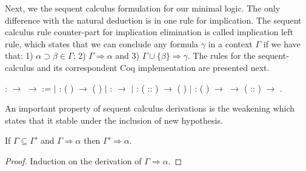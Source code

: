 Next, we the sequent calculus formulation for our minimal logic. The only
difference with the natural deduction is in one rule for implication. The
sequent calculus rule counter-part for implication elimination is called
implication left rule, which states that we can conclude any formula $\gamma$
in a context $\Gamma$ if we have that: 1) $\alpha \supset \beta \in \Gamma$;
2) $\Gamma \Rightarrow \alpha$ and 3) $\Gamma \cup \{\beta\} \Rightarrow
\gamma$. The rules for the sequent-calculus and its correspondent Coq
implementation are presented next.
 \begin{coqdoccode}
\coqdocemptyline
\coqdocnoindent
{}  : \coqdocvar{$\Gamma$} \ensuremath{\rightarrow} \coqdocvar{$\alpha$} \ensuremath{\rightarrow}  :=\coqdoceol
\coqdocnoindent
\ensuremath{|}   \coqdoceol
\coqdocindent{1.00em}
: ( ) \coqdocvar{$\in$}  \ensuremath{\rightarrow}   ( )\coqdoceol
\coqdocnoindent
\ensuremath{|}   \coqdoceol
\coqdocindent{1.00em}
:  \coqdocvar{$\in$}  \ensuremath{\rightarrow}   \coqdoceol
\coqdocnoindent
\ensuremath{|}    \coqdoceol
\coqdocindent{1.00em}
:  ( :: )  \ensuremath{\rightarrow}\coqdoceol
\coqdocindent{2.00em}
  (  )\coqdoceol
\coqdocnoindent
\ensuremath{|}     \coqdoceol
\coqdocindent{1.00em}
: (  ) \coqdocvar{$\in$}  \ensuremath{\rightarrow}\coqdoceol
\coqdocindent{2.00em}
   \ensuremath{\rightarrow}\coqdoceol
\coqdocindent{2.00em}
 ( :: )  \ensuremath{\rightarrow}\coqdoceol
\coqdocindent{2.00em}
  .\coqdoceol
\coqdocemptyline
\end{coqdoccode}
An important property of sequent calculus derivations is the weakening which
states that it stable under the inclusion of new hypothesis.

\begin{Lemma}[Weakening]\label{lemma:weak}
If $\Gamma \subseteq \Gamma'$ and $\Gamma\Rightarrow \alpha$ then $\Gamma'\Rightarrow \alpha$.
\end{Lemma}
\begin{proof}
  Induction on the derivation of $\Gamma\Rightarrow\alpha$.
\end{proof}

